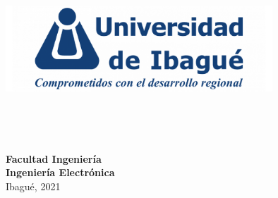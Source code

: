 \begin{titlepage}

\center %

\includegraphics[width=10cm]{title/unibague.png}\\[0.5cm] 

\vspace*{3\baselineskip}

\makeatletter
{ \LARGE \bfseries \thesistitle}\\[1.5cm] %

\vspace*{10\baselineskip}

{ \Large \bfseries \authorname}\\[0.7cm] 


\vspace*{4\baselineskip}

\vfill
\large{ \bfseries Facultad Ingeniería\\
Ingeniería Electrónica}\\
Ibagué, 2021
\vfill

\end{titlepage}